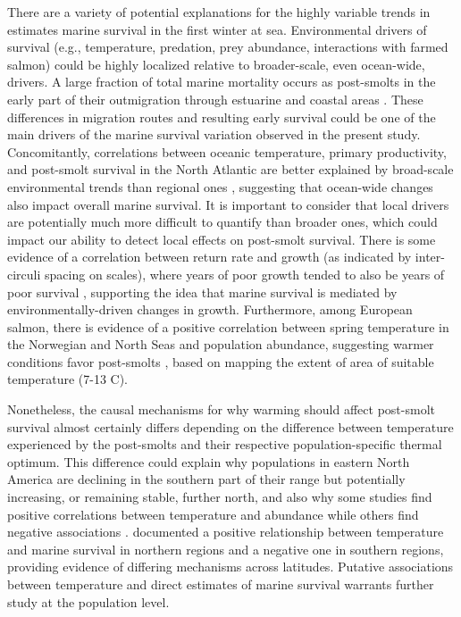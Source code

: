 \documentclass[12pt]{article}
\begin{document}
There are a variety of potential explanations for the highly variable trends
in estimates marine survival in the first winter at sea.
Environmental drivers of survival (e.g., temperature, predation, prey abundance,
interactions with farmed salmon) could be highly localized
relative to broader-scale, even ocean-wide, drivers.
A large fraction of total marine mortality occurs as post-smolts in the early
part of their outmigration through estuarine and coastal areas \citep{Halfyard2012, Chaput2019}.
These differences in migration routes and resulting early survival could be one
of the main drivers of the marine survival variation observed in the present study.
Concomitantly, correlations between oceanic temperature, primary
productivity, and post-smolt survival in the North Atlantic
are better explained by broad-scale environmental trends than regional ones
\citep{Olmos2020}, suggesting that ocean-wide changes also impact overall marine survival.
It is important to consider that local drivers are potentially much more difficult to quantify than
broader ones, which could impact our ability to detect local effects on post-smolt survival.
There is some evidence of a correlation between return rate and growth (as
indicated by inter-circuli spacing on scales), where years of poor growth
tended to also be years of poor survival \citep{Friedland1993}, supporting the
idea that marine survival is mediated by environmentally-driven changes in growth.
Furthermore, among European salmon, there is evidence of a positive correlation
between spring temperature in the Norwegian and North Seas and population abundance,
suggesting warmer
conditions favor post-smolts \citep{Friedland1998}, based on mapping the
extent of area of suitable temperature (7-13 \textdegree C).

Nonetheless, the causal mechanisms for why warming should affect post-smolt
survival almost certainly differs depending on the difference between
temperature experienced by the post-smolts and their respective
population-specific thermal optimum.
This difference could explain why populations in eastern North America are
declining in the southern part of their range but potentially increasing, or
remaining stable,
further north, and also why some studies find positive correlations between
temperature and abundance \citep{Friedland1998, Friedland1998b, Jonsson2004}
while others find negative associations \citep{Friedland1993, Todd2008}.
\citet{Olmos2020} documented a positive relationship between temperature and marine survival
in northern regions and a negative one in southern regions, providing
evidence of differing mechanisms across latitudes.
Putative associations between temperature and direct estimates of marine
survival warrants further study at the population level.
\end{document}
